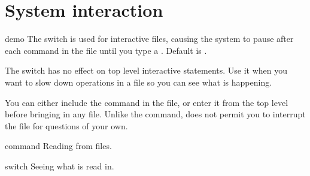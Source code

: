 
\section{System interaction}


\begin{Switch}{demo}
  The  switch is used for interactive files, causing
  the system to pause after each command in the file until you type a
  . Default is .

  \begin{Comments}
    The switch  has no effect on top level interactive
    statements. Use it when you want to slow down operations in a file
    so you can see what is happening.

    You can either include the  command in the file,
    or enter it from the top level before bringing in any file. Unlike
    the  command,  does not permit you to
    interrupt the file for questions of your own.
  \end{Comments}
  \begin{Related}
    \item [\name{in} command] Reading from files.
    \item [\name{echo} switch] Seeing what is read in.
  \end{Related}
\end{Switch}

